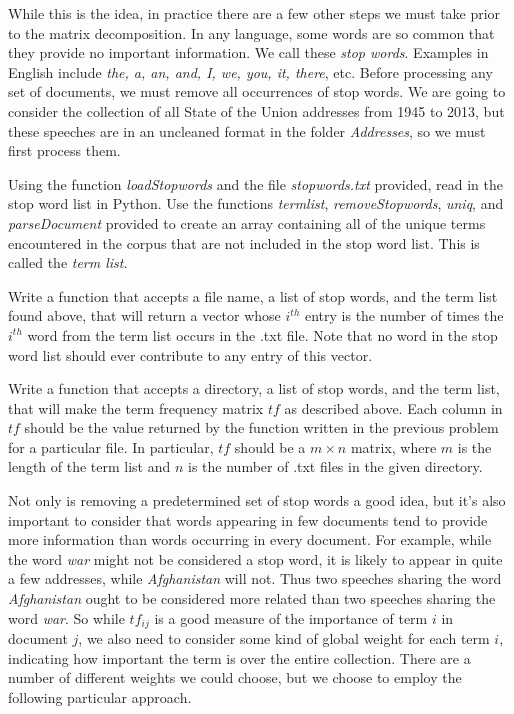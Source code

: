 While this is the idea, in practice there are a few other steps we must take prior to the matrix decomposition. In any language, some words are so common that they provide no important information. We call these \emph{stop words}. Examples in English include \emph{the, a, an, and, I, we, you, it, there}, etc. Before processing any set of documents, we must remove all occurrences of stop words. We are going to consider the collection of all State of the Union addresses from 1945 to 2013, but these speeches are in an uncleaned format in the folder \emph{Addresses}, so we must first process them.

\begin{problem}
Using the function \emph{loadStopwords} and the file \emph{stopwords.txt} provided, read in the stop word list in Python. Use the functions \emph{termlist}, \emph{removeStopwords}, \emph{uniq}, and \emph{parseDocument} provided to create an array containing all of the unique terms encountered in the corpus that are not included in the stop word list. This is called the \emph{term list}.
\end{problem}

\begin{problem}
Write a function that accepts a file name, a list of stop words, and the term list found above, that will return a vector whose $i^{th}$ entry is the number of times the $i^{th}$ word from the term list occurs in the .txt file. Note that no word in the stop word list should ever contribute to any entry of this vector.
\end{problem}

\begin{problem}
Write a function that accepts a directory, a list of stop words, and the term list, that will make the term frequency matrix $t\!f$ as described above. Each column in $t\!f$ should be the value returned by the function written in the previous problem for a particular file. In particular, $t\!f$ should be a $m \times n$ matrix, where $m$ is the length of the term list and $n$ is the number of .txt files in the given directory.
\end{problem}

Not only is removing a predetermined set of stop words a good idea, but it's also important to consider that words appearing in few documents tend to provide more information than words occurring in every document. For example, while the word \emph{war} might not be considered a stop word, it is likely to appear in quite a few addresses, while \emph{Afghanistan} will not. Thus two speeches sharing the word \emph{Afghanistan} ought to be considered more related than two speeches sharing the word \emph{war}. So while $t\!f_{ij}$ is a good measure of the importance of term $i$ in document $j$, we also need to consider some kind of global weight for each term $i$, indicating how important the term is over the entire collection. There are a number of different weights we could choose, but we choose to employ the following particular approach.

